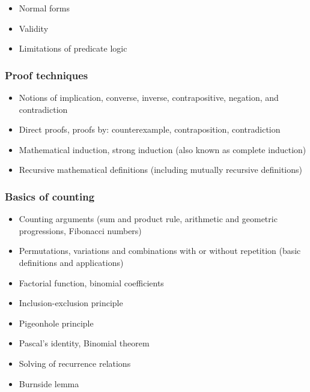 \documentclass[12pt]{article}
\begin{document}
		\begin{itemize}[label=]
			\item Normal forms
			\item Validity
			\item Limitations of predicate logic
		\end{itemize}
	
		\subsubsection{Proof techniques}
		\begin{itemize}[label=]
			\item Notions of implication, converse, inverse, contrapositive, negation, and contradiction
			\item Direct proofs, proofs by: counterexample, contraposition, contradiction
			\item Mathematical induction, strong induction (also known as complete induction)
			\item Recursive mathematical definitions (including mutually recursive definitions)
		\end{itemize}
		
		\subsubsection{Basics of counting}
		\begin{itemize}[label=]
			\item Counting arguments (sum and product rule, arithmetic and geometric progressions, Fibonacci numbers)
			\item Permutations, variations and combinations with or without repetition (basic definitions and applications) 
			\item Factorial function, binomial coefficients
			\item Inclusion-exclusion principle
			\item Pigeonhole principle
			\item Pascal’s identity, Binomial theorem
		\end{itemize}
		
		\begin{itemize}[label=]
			\item Solving of recurrence relations
			\item Burnside lemma
		\end{itemize}
	
\end{document}
